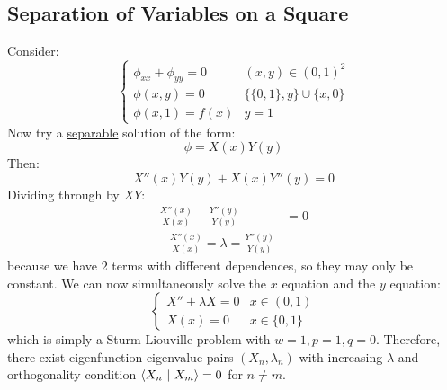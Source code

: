 \documentclass[../Main.tex]{subfiles}
\begin{document}
\subsection{Separation of Variables on a Square}
Consider:
\begin{equation*}
    \begin{cases}
        \phi_{xx} + \phi_{yy} = 0 & (x, y) \in (0, 1)^2 \\
        \phi(x, y) = 0 & \{\{0, 1\}, y\} \cup \{x, 0\} \\
        \phi(x, 1) = f(x) & y = 1
    \end{cases}
\end{equation*}
Now try a \underline{separable} solution of the form:
\begin{equation*}
    \phi = X(x) Y(y)
\end{equation*}
Then:
\begin{equation*}
    X''(x) Y(y) + X(x)Y''(y) = 0
\end{equation*}
Dividing through by $XY$:
\begin{align*}
    \frac{X''(x)}{X(x)} + \frac{Y''(y)}{Y(y)} &= 0 \\
    -\frac{X''(x)}{X(x)} = \lambda = \frac{Y''(y)}{Y(y)}
\end{align*}
because we have 2 terms with different dependences, so they may only be constant. We can now simultaneously solve the $x$ equation and the $y$ equation:
\begin{equation*}
    \begin{cases}
        X'' + \lambda X = 0 & x \in (0,1) \\
        X(x) = 0 & x \in \{0, 1\}
    \end{cases}
\end{equation*}
which is simply a Sturm-Liouville problem with $w = 1, p = 1, q = 0$. Therefore, there exist eigenfunction-eigenvalue pairs $(X_n, \lambda_n)$ with increasing $\lambda$ and orthogonality condition $\langle X_n~\vert~X_m\rangle = 0$ for $n \neq m$.
\end{document}
